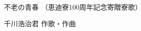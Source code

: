\documentclass[10pt,b5j]{tarticle} %
\begin{document}
\begin{minipage}[c]{0.7\hsize} %
    \begin{center}
        {\LARGE
            不老の青春 %
        }
        {\small 
            （恵迪寮100周年記念寄贈寮歌） %
        }
    \end{center}
\end{minipage}
\begin{minipage}[c]{0.3\hsize} %
    \begin{flushright} %
        千川浩治君 作歌・作曲 %
    \end{flushright}
\end{minipage}
\end{document}
